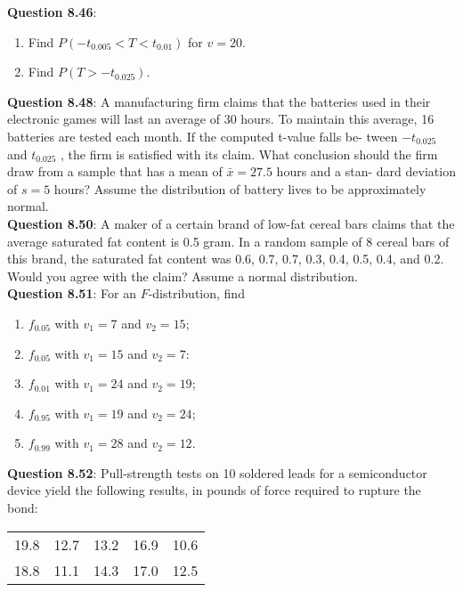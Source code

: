 \documentclass{article}
\begin{document}
    \textbf{Question 8.46}:
        \begin{enumerate}[label = (\alph*) ]
            \item Find $P(-t_{0.005} < T < t_{0.01})$ for $v = 20$.
            \item Find $P(T > -t_{0.025})$.
        \end{enumerate}
    \textbf{Question 8.48}: A manufacturing firm claims that the batteries
    used in their electronic games will last an average of
    30 hours. To maintain this average, 16 batteries are
    tested each month. If the computed t-value falls be-
    tween $-t_{0.025}$ and $t_{0.025}$ , the firm is satisfied with its
    claim. What conclusion should the firm draw from a
    sample that has a mean of $\bar{x} = 27.5$ hours and a stan-
    dard deviation of $s = 5$ hours? Assume the distribution
    of battery lives to be approximately normal.\\\newline
    \textbf{Question 8.50}: A maker of a certain brand of low-fat cereal bars
    claims that the average saturated fat content is 0.5
    gram. In a random sample of 8 cereal bars of this
    brand, the saturated fat content was 0.6, 0.7, 0.7, 0.3,
    0.4, 0.5, 0.4, and 0.2. Would you agree with the claim?
    Assume a normal distribution.\\\newline
    \textbf{Question 8.51}: For an $F$-distribution, find
        \begin{enumerate}[label = (\alph*) ]
            \item $f_{0.05}$ with $v_1 = 7$ and $v_2 = 15$;
            \item $f_{0.05}$ with $v_1 = 15$ and $v_2 = 7$:
            \item $f_{0.01}$ with $v_1 = 24$ and $v_2 = 19$;
            \item $f_{0.95}$ with $v_1 = 19$ and $v_2 = 24$;
            \item $f_{0.99}$ with $v_1 = 28$ and $v_2 = 12$.
        \end{enumerate}
    \textbf{Question 8.52}: Pull-strength tests on 10 soldered leads for a
    semiconductor device yield the following results, in
    pounds of force required to rupture the bond:
        \begin{center}
            \begin{tabular}{c c c c c}
                19.8 & 12.7 & 13.2 & 16.9 & 10.6 \\
                18.8 & 11.1 & 14.3 & 17.0 & 12.5
            \end{tabular}
        \end{center}
\end{document}
